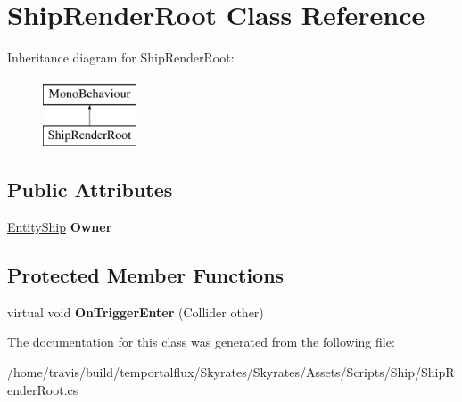 \hypertarget{class_ship_render_root}{\section{Ship\-Render\-Root Class Reference}
\label{class_ship_render_root}
}
Inheritance diagram for Ship\-Render\-Root\-:\begin{figure}[H]
\begin{center}
\leavevmode
\includegraphics[height=2.000000cm]{class_ship_render_root}
\end{center}
\end{figure}
\subsection*{Public Attributes}
\begin{DoxyCompactItemize}
\item 
\hypertarget{class_ship_render_root_a7178f622fe6b018faa2611f53e42193a}{\hyperlink{class_skyrates_1_1_entity_1_1_entity_ship}{Entity\-Ship} {\bfseries Owner}}\label{class_ship_render_root_a7178f622fe6b018faa2611f53e42193a}

\end{DoxyCompactItemize}
\subsection*{Protected Member Functions}
\begin{DoxyCompactItemize}
\item 
\hypertarget{class_ship_render_root_a5d12b0376667dda444bb945cc333e643}{virtual void {\bfseries On\-Trigger\-Enter} (Collider other)}\label{class_ship_render_root_a5d12b0376667dda444bb945cc333e643}

\end{DoxyCompactItemize}


The documentation for this class was generated from the following file\-:\begin{DoxyCompactItemize}
\item 
/home/travis/build/temportalflux/\-Skyrates/\-Skyrates/\-Assets/\-Scripts/\-Ship/Ship\-Render\-Root.\-cs\end{DoxyCompactItemize}

